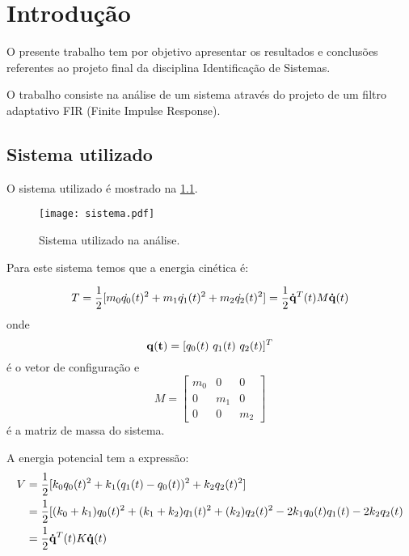 \chapter{Introdução}

O presente trabalho tem por objetivo apresentar os resultados e conclusões referentes ao projeto final da disciplina Identificação de Sistemas.

O trabalho consiste na análise de um sistema através do projeto de um filtro adaptativo  FIR (Finite Impulse Response). 

\section{Sistema utilizado}

O sistema utilizado é mostrado na \cref{fig:sistema}. 

\begin{figure}[!h]
	\centering
	\texttt{[image: sistema.pdf]}
	\caption{Sistema utilizado na análise.}
	\label{fig:sistema}
\end{figure}

Para este sistema temos que a energia cinética é:

\begin{equation}
T 
= \frac{1}{2}[m_0\dot{q_0}(t)^2 + m_1\dot{q_1}(t)^2 + m_2\dot{q_2}(t)^2] 
= \frac{1}{2}{\bf \dot{q}}^T(t)M{\bf \dot{q}}(t)
\end{equation}
onde 
\begin{equation*}
{\bf q(t)} = [q_0(t) \  q_1(t) \ q_2(t)]^T
\end{equation*}
é o vetor de configuração e
\begin{equation*}
M = 
\begin{bmatrix} 
m_0 & 0 & 0\\
0 & m_1 & 0 \\
0 & 0 & m_2
\end{bmatrix}
\end{equation*}  
é a matriz de massa do sistema.

A energia potencial tem a expressão:
\begin{equation}
\begin{split}
V &= \frac{1}{2}[k_0 q_0(t)^2 + k_1(q_1(t) - q_0(t))^2 + k_2 q_2(t)^2] \\
&= \frac{1}{2}[(k_0+k_1)q_0(t)^2 + (k_1+k_2)q_1(t)^2 + (k_2)q_2(t)^2 -2k_1  q_0(t)q_1(t) - 2k_2 q_2(t) \\
&= \frac{1}{2}{\bf \dot{q}}^T(t) K  {\bf \dot{q}}(t)
\end{split}
\end{equation}

